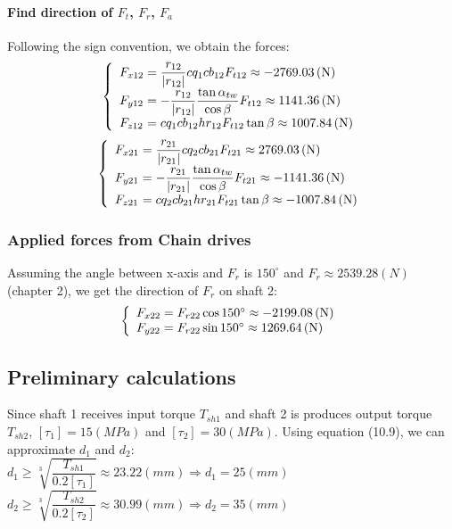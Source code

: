 \paragraph{Find direction of $ F_{t} $, $ F_r $, $ F_a $}
Following the sign convention, we obtain the forces:
\[
\left\{ 
\begin{array}{l@{{}={}}l}
F_{x12}& \dfrac{r_{12}}{|r_{12}|}cq_1cb_{12}F_{t12}\approx-2769.03\unit{(N)}\\

F_{y12}& -\dfrac{r_{12}}{|r_{12}|}\dfrac{\tan\alpha_{tw}}{\cos\beta}F_{t12}\approx1141.36\unit{(N)}\\

F_{z12}& cq_1cb_{12}hr_{12}F_{t12}\tan\beta\approx1007.84\unit{(N)}\\ 
\end{array}
\right.
\]
\[
\left\{ 
\begin{array}{l@{{}={}}l}
F_{x21}& \dfrac{r_{21}}{|r_{21}|}cq_2cb_{21}F_{t21}\approx2769.03\unit{(N)}\\

F_{y21}& -\dfrac{r_{21}}{|r_{21}|}\dfrac{\tan\alpha_{tw}}{\cos\beta}F_{t21}\approx-1141.36\unit{(N)}\\

F_{z21}& cq_2cb_{21}hr_{21}F_{t21}\tan\beta\approx-1007.84\unit{(N)}\\ 
\end{array}
\right.
\]

\subsubsection{Applied forces from Chain drives}
Assuming the angle between x-axis and $ F_r $ is $ 150^\circ $ and $ F_r \approx 2539.28\unit{(N)} $ (chapter 2), we get the direction of $ F_r $ on shaft 2:
\[
\left\{ 
\begin{array}{l@{{}={}}l}
F_{x22}& F_{r22}\cos150^\circ\approx-2199.08\unit{(N)}\\

F_{y22}& F_{r22}\sin150^\circ\approx1269.64\unit{(N)}\\
\end{array}
\right.
\]

\subsection{Preliminary calculations}
Since shaft 1 receives input torque $ T_{sh1} $ and shaft 2 is produces output torque $ T_{sh2} $, $ [\tau_1] = 15\unit{(MPa)}$ and $ [\tau_2]=30\unit{(MPa)} $. Using equation (10.9), we can approximate $ d_1 $ and $ d_2 $:\\
$ d_1 \geq \sqrt[3]{\dfrac{T_{sh1}}{0.2[\tau_1]}} \approx 23.22\unit{(mm)}\Rightarrow d_1 = 25\unit{(mm)}$\\
$ d_2 \geq \sqrt[3]{\dfrac{T_{sh2}}{0.2[\tau_2]}} \approx 30.99\unit{(mm)}\Rightarrow d_2 = 35\unit{(mm)}$

